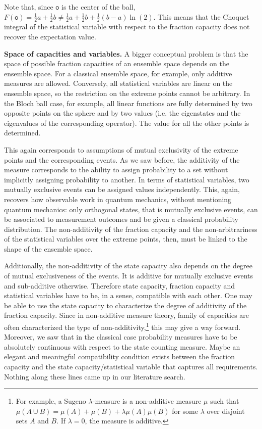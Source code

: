 \documentclass[10pt,twocolumn, nofootinbib]{revtex4-2}
\newcommand{\ens}[1][e] {\mathsf{#1}} %
\begin{document}
Note that, since $\ens[o]$ is the center of the ball, $F(\ens[o]) = \frac{1}{2} a + \frac{1}{2} b \neq \frac{1}{2} a + \frac{1}{2} b + \frac{1}{2}\left(b - a\right)\ln (2)$. This means that the Choquet integral of the statistical variable with respect to the fraction capacity does not recover the expectation value.

\textbf{Space of capacities and variables.} A bigger conceptual problem is that the space of possible fraction capacities of an ensemble space depends on the ensemble space. For a classical ensemble space, for example, only additive measures are allowed. Conversely, all statistical variables are linear on the ensemble space, so the restriction on the extreme points cannot be arbitrary. In the Bloch ball case, for example, all linear functions are fully determined by two opposite points on the sphere and by two values (i.e. the eigenstates and the eigenvalues of the corresponding operator). The value for all the other points is determined.

This again corresponds to assumptions of mutual exclusivity of the extreme points and the corresponding events. As we saw before, the additivity of the measure corresponds to the ability to assign probability to a set without implicitly assigning probability to another. In terms of statistical variables, two mutually exclusive events can be assigned values independently. This, again, recovers how observable work in quantum mechanics, without mentioning quantum mechanics: only orthogonal states, that is mutually exclusive events, can be associated to measurement outcomes and be given a classical probability distribution. The non-additivity of the fraction capacity and the non-arbitrariness of the statistical variables over the extreme points, then, must be linked to the shape of the ensemble space.

Additionally, the non-additivity of the state capacity also depends on the degree of mutual exclusiveness of the events. It is additive for mutually exclusive events and sub-additive otherwise. Therefore state capacity, fraction capacity and statistical variables have to be, in a sense, compatible with each other. One may be able to use the state capacity to characterize the degree of additivity of the fraction capacity. Since in non-additive measure theory, family of capacities are often characterized the type of non-additivity,\footnote{For example, a Sugeno $\lambda$-measure is a non-additive measure $\mu$ such that $\mu(A \cup B) = \mu(A) + \mu(B) + \lambda \mu(A)\mu(B)$ for some $\lambda$ over disjoint sets $A$ and $B$. If $\lambda = 0$, the measure is additive.} this may give a way forward. Moreover, we saw that in the classical case probability measures have to be absolutely continuous with respect to the state counting measure. Maybe an elegant and meaningful compatibility condition exists between the fraction capacity and the state capacity/statistical variable that captures all requirements. Nothing along these lines came up in our literature search.
\end{document}
